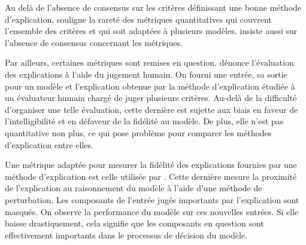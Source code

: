 \documentclass{report}
\newenvironment{comb}
    {\begin{color}{olive}
    }
    { 
    \end{color}
    }
\newcommand{\alh}[1]{\textcolor{teal}{#1}}
\begin{document}
    
    Au delà de l'absence de consensus sur les critères définissant une bonne méthode d'explication, \cite{garouani_investigating_2024} souligne la rareté des métriques quantitatives qui couvrent l'ensemble des critères et qui soit adaptées à plusieurs modèles. \cite{mersha_evaluating_2025} insiste aussi sur l'absence de consensus concernant les métriques.
    
    Par ailleurs, certaines métriques sont remises en question. \cite{gilpin_explaining_2019} dénonce l'évalua\-tion des explications à l'aide du jugement humain. On fourni une entrée, sa sortie pour un modèle et l'explication obtenue par la méthode d'explication étudiée à un évaluateur humain chargé de juger plusieurs critères. Au-delà de la difficulté d'organiser une telle évaluation, cette dernière est sujette aux biais en faveur de l'intelligibilité et en défaveur de la fidélité au modèle. De plus, elle n'est pas quantitative non plus, ce qui pose problème pour comparer les méthodes d'explication entre elles.
    
    
    Une métrique adaptée pour mesurer la fidélité des explications fournies par une méthode d'explication est celle utilisée par \cite{chefer_transformer_2021}. Cette dernière mesure la proximité de l'explication au raisonnement du modèle à l'aide d'une méthode de perturbation. Les composants de l'entrée jugés importants par l'explication sont masqués. On observe la performance du modèle sur ces nouvelles entrées. Si elle baisse drastiquement, cela signifie que les composants en question sont effectivement importants dans le processus de décision du modèle. 
    
    
    
    
    
\end{document}
